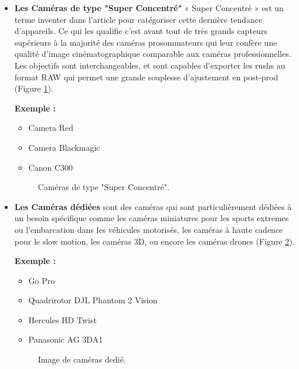 \begin{itemize}
 	\item \textbf{Les Caméras de type "Super Concentré"} « Super Concentré » est un terme inventer dans l'article\cite{noauthor_les_2015} pour catégoriser cette dernière tendance d’appareils. Ce qui les qualifie c’est avant tout de très grands capteurs supérieurs à la majorité des caméras prosommateurs qui leur confère une qualité d’image cinématographique comparable aux caméras professionnelles. Les objectifs sont interchangeables, et sont capables d’exporter les rushs au format RAW qui permet une grande souplesse d’ajustement en post-prod (Figure \ref{fig:Caméras de type "Super Concentré"}).
 	
 	\textbf{Exemple :}
 	\begin{itemize}
 		\item Camera Red
 		\item Camera Blackmagic
 		\item Canon C300
 	\end{itemize}
 	 
 	 \begin{figure}[H]%
 	 	\center%
 	 	\setlength{\fboxsep}{5pt}%
 	 	\setlength{\fboxrule}{0.5pt}%
 	 \caption[Caméras de type "Super Concentré" ]{Caméras de type "Super Concentré".}
 	 \label{fig:Caméras de type "Super Concentré"}
 	 \end{figure}
 	 
 	\item \textbf{Les Caméras dédiées} sont des caméras qui sont particulièrement dédiées à un besoin spécifique comme les caméras miniatures pour les sports extremes ou l’embarcation dans les véhicules motorisés, les caméras à haute cadence pour le slow motion, les caméras 3D, ou encore les caméras drones (Figure \ref{fig:Caméras dedié}).
 	
 	\textbf{Exemple :}
 	
 	\begin{itemize}
 		\item Go Pro
 		\item Quadrirotor DJL Phantom 2 Vision
 		\item Hercules HD Twist
 		\item Panasonic AG 3DA1
 	\end{itemize}
 	
 	\begin{figure}[H]%
 		\center%
 		\setlength{\fboxsep}{5pt}%
 		\setlength{\fboxrule}{0.5pt}%
 		\caption[Caméras dedié]{Image de caméras dedié.}
 	\label{fig:Caméras dedié}
 	\end{figure}
 	
 \end{itemize}
 
